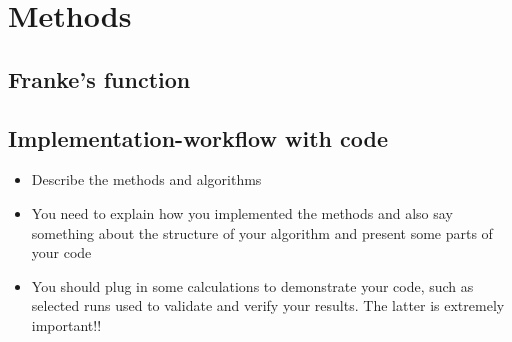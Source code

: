 \documentclass[aps,rmp,reprint,amsmath,amssymb,graphicx,longbibliography]{revtex4-1}
\begin{document}
\begin{comment}
Traditionally, the field of AI/ML has had its main focus on
predictions and correlations.  In AI/ML and prediction-based tasks, we
are often interested in developing algorithms that are capable of
learning patterns from existing data in an automated fashion, and then
using these learned patterns to make predictions or assessments of new
data. In some cases, our primary concern is the quality of the
predictions or assessments, with perhaps less focus on the underlying
patterns (and probability distributions) that were learned in order to
make these predictions.  However, in many nuclear physics studies, we
are equally interested in being able to estimate errors and find
causations.  In this Colloquium, we emphasize the role of predictions
and correlations as well as error estimation and causations in
statistical learning and ML.  For general references on these topics
and discussions of frequentist and Bayesian methodologies, see, e.g.,
\cite{goodfellow2016}.

\newpage

%
%

\end{comment}

\section{Methods}
\subsection{Franke's function}
\subsection{Implementation-workflow with code}
\begin{itemize}
    \item Describe the methods and algorithms
    \item You need to explain how you implemented the methods and also say something about the structure of your algorithm and present some parts of your code
    \item You should plug in some calculations to demonstrate your code, such as selected runs used to validate and verify your results. The latter is extremely important!!
\end{itemize}
\end{document}

